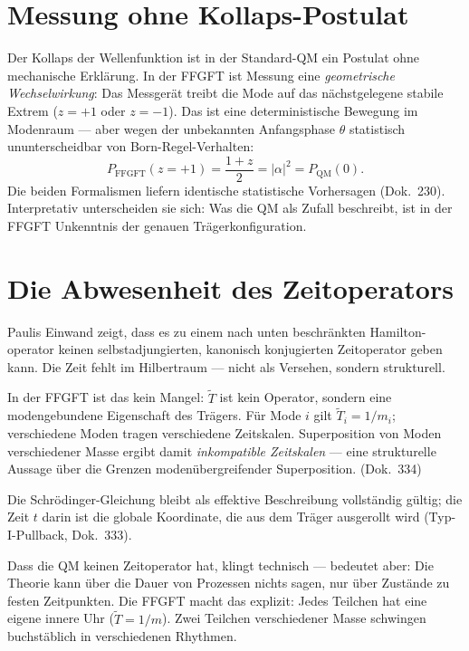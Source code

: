 \section{Messung ohne Kollaps-Postulat}

Der Kollaps der Wellenfunktion ist in der Standard-QM ein Postulat
ohne mechanische Erklärung. In der FFGFT ist Messung eine
\emph{geometrische Wechselwirkung}: Das Messgerät treibt die Mode
auf das nächstgelegene stabile Extrem ($z=+1$ oder $z=-1$). Das ist
eine deterministische Bewegung im Modenraum — aber wegen der
unbekannten Anfangsphase $\theta$ statistisch ununterscheidbar
von Born-Regel-Verhalten:
\begin{equation}
  P_{\mathrm{FFGFT}}(z=+1) = \frac{1+z}{2} = |\alpha|^2 = P_{\mathrm{QM}}(0).
\end{equation}
Die beiden Formalismen liefern identische statistische Vorhersagen
(Dok.~230). Interpretativ unterscheiden sie sich: Was die QM als Zufall
beschreibt, ist in der FFGFT Unkenntnis der genauen Trägerkonfiguration.

\section{Die Abwesenheit des Zeitoperators}

Paulis Einwand zeigt, dass es zu einem nach unten beschränkten Hamilton-
operator keinen selbstadjungierten, kanonisch konjugierten Zeitoperator
geben kann. Die Zeit fehlt im Hilbertraum — nicht als Versehen,
sondern strukturell.

In der FFGFT ist das kein Mangel: $\tilde T$ ist kein Operator, sondern
eine modengebundene Eigenschaft des Trägers. Für Mode $i$ gilt
$\tilde T_i = 1/m_i$; verschiedene Moden tragen verschiedene Zeitskalen.
Superposition von Moden verschiedener Masse ergibt damit
\emph{inkompatible Zeitskalen} — eine strukturelle Aussage über die
Grenzen modenübergreifender Superposition. (Dok.~334)

Die Schrödinger-Gleichung bleibt als effektive Beschreibung vollständig
gültig; die Zeit $t$ darin ist die globale Koordinate, die aus dem
Träger ausgerollt wird (Typ-I-Pullback, Dok.~333).

\begin{laierspur}
Dass die QM keinen Zeitoperator hat, klingt technisch — bedeutet aber:
Die Theorie kann über die Dauer von Prozessen nichts sagen, nur über
Zustände zu festen Zeitpunkten. Die FFGFT macht das explizit: Jedes
Teilchen hat eine eigene innere Uhr ($\tilde T = 1/m$). Zwei Teilchen
verschiedener Masse schwingen buchstäblich in verschiedenen Rhythmen.
\end{laierspur}
